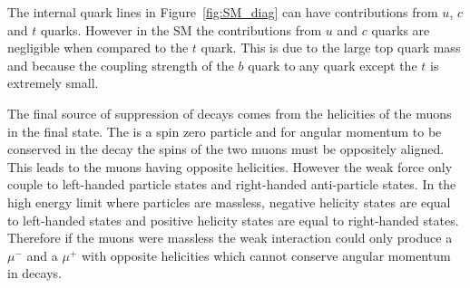 The internal quark lines in Figure~\ref{fig:SM_diag} can have contributions from $u$, $c$ and $t$ quarks. However in the SM the contributions from $u$ and $c$ quarks are negligible when compared to the $t$ quark. This is due to the large top quark mass and because the coupling strength of the $b$ quark to any quark except the $t$ is extremely small.


The final source of suppression of \bmumu decays comes from the helicities of the muons in the final state. The \bds is a spin zero particle and for angular momentum to be conserved in the decay the spins of the two muons must be oppositely aligned. This leads to the muons having opposite helicities. %
However the weak force only couple to left-handed particle states and right-handed anti-particle states. In the high energy limit where particles are massless, negative helicity states are equal to left-handed states and positive helicity states are equal to right-handed states.
Therefore if the muons were massless the weak interaction could only produce a $\mu^-$ and a $\mu^+$ with opposite helicities which cannot conserve angular momentum in \bmumu decays.
